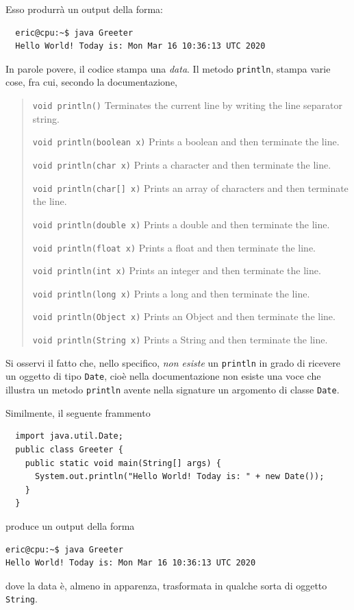 \documentclass[\fontsizeclass,twocolumn]{\classname}
\theoremstyle{definition}
\theoremstyle{definition}
\begin{document}
Esso produrrà un output della forma:
\begin{verbatim}
  eric@cpu:~$ java Greeter
  Hello World! Today is: Mon Mar 16 10:36:13 UTC 2020
\end{verbatim}

In parole povere, il codice stampa una \emph{data}. Il metodo \texttt{println},
stampa varie cose, fra cui, secondo la documentazione,
\begin{quote}
    \footnotesize{\texttt{void	println()}	Terminates the current line by writing the line separator string.

        \texttt{void	println(boolean x)}	Prints a boolean and then terminate the line.

        \texttt{void	println(char x)}	Prints a character and then terminate the line.

        \texttt{void	println(char[] x)}	Prints an array of characters and then terminate the line.

        \texttt{void	println(double x)}	Prints a double and then terminate the line.

        \texttt{void	println(float x)}	Prints a float and then terminate the line.

        \texttt{void	println(int x)}	Prints an integer and then terminate the line.

        \texttt{void	println(long x)}	Prints a long and then terminate the line.

        \texttt{void	println(Object x)}	Prints an Object and then terminate the line.

    \texttt{void	println(String x)}	Prints a String and then terminate the line.}
\end{quote}

Si osservi il fatto che, nello specifico, \emph{non esiste} un \texttt{println}
in grado di ricevere un oggetto di tipo \texttt{Date}, cioè nella documentazione
non esiste una voce che illustra un metodo \texttt{println} avente nella
signature un argomento di classe \texttt{Date}.

Similmente, il seguente frammento

\begin{lstlisting}
  import java.util.Date;
  public class Greeter {
    public static void main(String[] args) {
      System.out.println("Hello World! Today is: " + new Date());
    }
  }
\end{lstlisting}

produce un output della forma
\begin{verbatim}
eric@cpu:~$ java Greeter
Hello World! Today is: Mon Mar 16 10:36:13 UTC 2020
\end{verbatim}
dove la data è, almeno in apparenza, trasformata in qualche sorta di oggetto \texttt{String}. 
\end{document}
